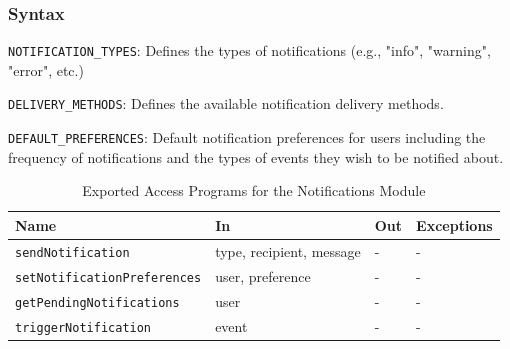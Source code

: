 \documentclass[12pt, titlepage]{article}
\begin{document}
\subsubsection{Syntax}
\begin{description}
  \item[Exported Constants and Access Programs:]
  \item 
  \texttt{NOTIFICATION\_TYPES}: Defines the types of notifications (e.g., "info", "warning", "error", etc.)
  \item \texttt{DELIVERY\_METHODS}: Defines the available notification delivery methods.
  \item \texttt{DEFAULT\_PREFERENCES}: Default notification preferences for users including the 
  frequency of notifications and the types of events they wish to be notified about.

  \begin{table}[H]
    \centering
    \begin{tabular}{p{} p{} p{} p{}}
    \toprule
    \textbf{Name} & \textbf{In} & \textbf{Out} & \textbf{Exceptions}\\
    \midrule
    
    \texttt{sendNotification} & type, recipient, message & - & - \\
    \midrule
    
    \texttt{setNotificationPreferences} & user, preference & - & - \\
    \midrule

    \texttt{getPendingNotifications} & user & - & - \\
    \midrule

    \texttt{triggerNotification} & event & - & - \\

    \bottomrule
    
    \end{tabular}
    \caption{Exported Access Programs for the Notifications Module}
    \label{TblEAP_Notifications}
  \end{table}
\end{description}
\end{document}
